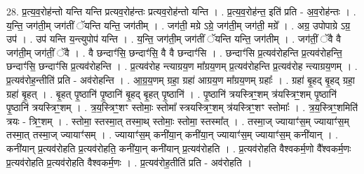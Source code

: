 \documentclass[17pt]{extarticle}
\begin{document}
28. प्र॒त्य॒व॒रोह॑न्तो यन्ति यन्ति प्रत्यव॒रोह॑न्तः प्रत्यव॒रोह॑न्तो यन्ति । . प्र॒त्य॒व॒रोह॑न्त॒ इति॑ प्रति - अ॒व॒रोह॑न्तः । . य॒न्ति॒ जग॑ती॒म् जग॑तीं ॅयन्ति यन्ति॒ जग॑तीम् । . जग॑ती॒ मग्रे ऽग्रे॒ जग॑ती॒म् जग॑ती॒ मग्रे᳚ । . अग्र॒ उपोपाग्रे ऽग्र॒ उप॑ । . उप॑ यन्ति य॒न्त्युपोप॑ यन्ति । . य॒न्ति॒ जग॑ती॒म् जग॑तीं ॅयन्ति यन्ति॒ जग॑तीम् । . जग॑तीं॒ ॅवै वै जग॑ती॒म् जग॑तीं॒ ॅवै । . वै छन्दाꣳ॑सि॒ छन्दाꣳ॑सि॒ वै वै छन्दाꣳ॑सि । . छन्दाꣳ॑सि प्र॒त्यव॑रोहन्ति प्र॒त्यव॑रोहन्ति॒ छन्दाꣳ॑सि॒ छन्दाꣳ॑सि प्र॒त्यव॑रोहन्ति । . प्र॒त्यव॑रोह न्त्याग्रय॒ण मा᳚ग्रय॒णम् प्र॒त्यव॑रोहन्ति प्र॒त्यव॑रोह न्त्याग्रय॒णम् । . प्र॒त्यव॑रोह॒न्तीति॑ प्रति - अव॑रोहन्ति । . आ॒ग्र॒य॒णम् ग्रहा॒ ग्रहा॑ आग्रय॒ण मा᳚ग्रय॒णम् ग्रहाः᳚ । . ग्रहा॑ बृ॒हद् बृ॒हद् ग्रहा॒ ग्रहा॑ बृ॒हत् । . बृ॒हत् पृ॒ष्ठानि॑ पृ॒ष्ठानि॑ बृ॒हद् बृ॒हत् पृ॒ष्ठानि॑ । . पृ॒ष्ठानि॑ त्रयस्त्रिꣳ॒॒शम् त्र॑यस्त्रिꣳ॒॒शम् पृ॒ष्ठानि॑ पृ॒ष्ठानि॑ त्रयस्त्रिꣳ॒॒शम् । . त्र॒य॒स्त्रिꣳ॒॒शꣳ स्तोमाः॒ स्तोमा᳚ स्त्रयस्त्रिꣳ॒॒शम् त्र॑यस्त्रिꣳ॒॒शꣳ स्तोमाः᳚ । . त्र॒य॒स्त्रिꣳ॒॒शमिति॑ त्रयः - त्रिꣳ॒॒शम् । . स्तोमा॒ स्तस्मा॒त् तस्मा॒थ् स्तोमाः॒ स्तोमा॒ स्तस्मा᳚त् । . तस्मा॒ज् ज्यायाꣳ॑स॒म् ज्यायाꣳ॑स॒म् तस्मा॒त् तस्मा॒ज् ज्यायाꣳ॑सम् । . ज्यायाꣳ॑स॒म् कनी॑या॒न् कनी॑या॒न् ज्यायाꣳ॑स॒म् ज्यायाꣳ॑स॒म् कनी॑यान् । . कनी॑यान् प्र॒त्यव॑रोहति प्र॒त्यव॑रोहति॒ कनी॑या॒न् कनी॑यान् प्र॒त्यव॑रोहति । . प्र॒त्यव॑रोहति वैश्वकर्म॒णो वै᳚श्वकर्म॒णः प्र॒त्यव॑रोहति प्र॒त्यव॑रोहति वैश्वकर्म॒णः । . प्र॒त्यव॑रोह॒तीति॑ प्रति - अव॑रोहति । \newline
\end{document}
